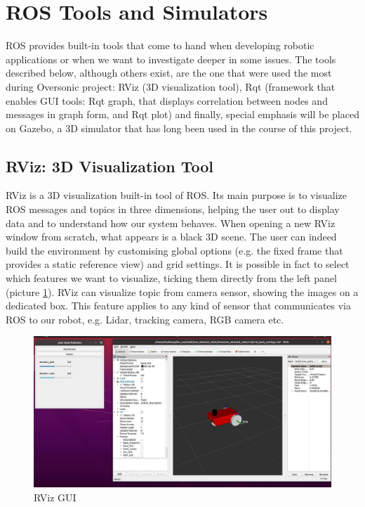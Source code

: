 \section{ROS Tools and Simulators}
ROS provides built-in tools that come to hand when developing robotic applications or when we want to investigate deeper in some issues.
The tools described below, although others exist, are the one that were used the most during Oversonic project: RViz (3D visualization tool), Rqt (framework that enables GUI tools: Rqt graph, that displays correlation between nodes and messages in graph form, and Rqt plot) and finally, special emphasis will be placed on Gazebo, a 3D simulator that has long been used in the course of this project.
\subsection{RViz: 3D Visualization Tool}
RViz is a 3D visualization built-in tool of ROS.
Its main purpose is to visualize ROS messages and topics in three dimensions, helping the user out to display data and to understand how our system behaves.
When opening a new RViz window from scratch, what appears is a black 3D scene. The user can indeed build the environment by customising global options (e.g. the fixed frame that provides a static reference view) and grid settings.
It is possible in fact to select which features we want to visualize, ticking them directly from the left panel (picture \ref{fig:rvizgui}).
RViz can visualize topic from camera sensor, showing the images on a dedicated box. This feature applies to any kind of sensor that communicates via ROS to our robot, e.g. Lidar, tracking camera, RGB camera etc. 
\begin{figure}[H]
    \centering
    \includegraphics[scale = 0.5]{Images/Chapter 2/rviz.jpg}
    \caption{RViz GUI}
    \label{fig:rvizgui}
\end{figure}
